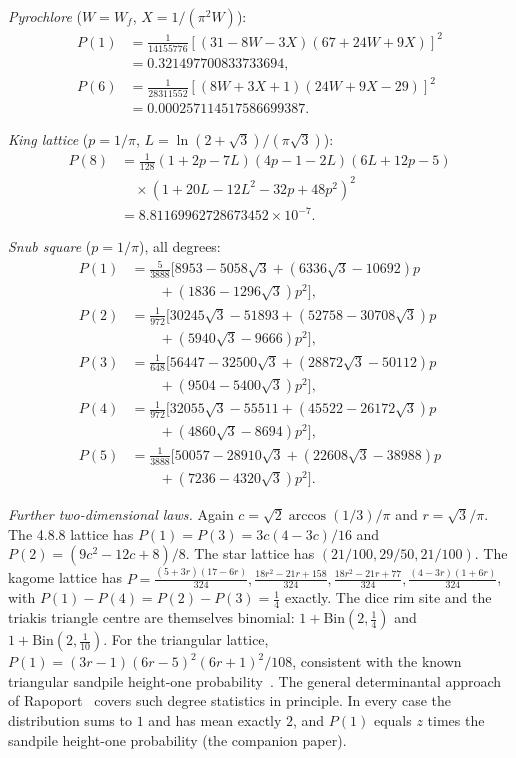 \documentclass[aps,pra,10pt,twocolumn,superscriptaddress,nofootinbib]{revtex4-2}
\newcommand{\sq}{\sqrt{3}}
\begin{document}
\emph{Pyrochlore} ($W=W_f$, $X=1/(\pi^2W)$):
\begin{align}
P(1)&=\tfrac{1}{14155776}[(31-8W-3X)(67+24W+9X)]^2\nonumber\\
&=0.321497700833733694,\nonumber\\
P(6)&=\tfrac{1}{28311552}[(8W+3X+1)(24W+9X-29)]^2\nonumber\\
&=0.000257114517586699387 .
\end{align}

\emph{King lattice} ($p=1/\pi$, $L=\ln(2+\sq)/(\pi\sq)$):
\begin{align}
P(8)&=\tfrac1{128}(1+2p-7L)(4p-1-2L)(6L+12p-5)\nonumber\\
&\quad\times(1+20L-12L^2-32p+48p^2)^2\nonumber\\
&=8.81169962728673452\times10^{-7}.
\end{align}

\emph{Snub square} ($p=1/\pi$), all degrees:
\begin{align}
P(1)&=\tfrac{5}{3888}\bigl[8953-5058\sq+(6336\sq-10692)p\nonumber\\
&\qquad+(1836-1296\sq)p^2\bigr],\nonumber\\
P(2)&=\tfrac1{972}\bigl[30245\sq-51893+(52758-30708\sq)p\nonumber\\
&\qquad+(5940\sq-9666)p^2\bigr],\nonumber\\
P(3)&=\tfrac1{648}\bigl[56447-32500\sq+(28872\sq-50112)p\nonumber\\
&\qquad+(9504-5400\sq)p^2\bigr],\nonumber\\
P(4)&=\tfrac1{972}\bigl[32055\sq-55511+(45522-26172\sq)p\nonumber\\
&\qquad+(4860\sq-8694)p^2\bigr],\nonumber\\
P(5)&=\tfrac1{3888}\bigl[50057-28910\sq+(22608\sq-38988)p\nonumber\\
&\qquad+(7236-4320\sq)p^2\bigr].
\end{align}

\emph{Further two-dimensional laws.} Again $c=\sqrt2\arccos(1/3)/\pi$ and $r=\sq/\pi$.
The 4.8.8 lattice has $P(1)=P(3)=3c(4-3c)/16$ and $P(2)=(9c^2-12c+8)/8$.
The star lattice has $(21/100,29/50,21/100)$.
The kagome lattice has
$P=\tfrac{(5+3r)(17-6r)}{324},\tfrac{18r^2-21r+158}{324},\tfrac{18r^2-21r+77}{324},\tfrac{(4-3r)(1+6r)}{324}$,
with $P(1)-P(4)=P(2)-P(3)=\tfrac14$ exactly.
The dice rim site and the triakis triangle centre are themselves binomial:
$1+\mathrm{Bin}(2,\tfrac14)$ and $1+\mathrm{Bin}(2,\tfrac1{10})$.
For the triangular lattice, $P(1)=(3r-1)(6r-5)^2(6r+1)^2/108$, consistent with the known triangular
sandpile height-one probability~\cite{PonceletRuelle2017}. The general determinantal approach of
Rapoport~\cite{Rapoport2023} covers such degree statistics in principle.
In every case the distribution sums to $1$ and has mean exactly $2$, and $P(1)$ equals $z$
times the sandpile height-one probability (the companion paper).
\end{document}
